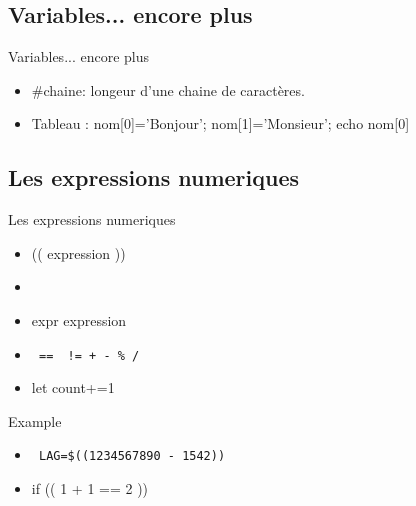 \def\subsectitle{Variables... encore plus}
\subsection{\subsectitle}
\begin{frame}{\sectitle}
\begin{block}{\subsectitle}
\begin{itemize}
\item \textdollar\textbraceleft\#chaine\textbraceright  : longeur d'une chaine de caractères.
\item Tableau : nom[0]='Bonjour'; nom[1]='Monsieur'; echo \textdollar nom[0]
\end{itemize}
\end{block}
\end{frame}

\def\subsectitle{Les expressions numeriques}
\subsection{\subsectitle}
\begin{frame}[containsverbatim]{\sectitle}
\begin{block}{\subsectitle}
\begin{itemize}
\item \textdollar (( expression ))
\item \textdollar [ expression ]
\item expr expression
\item \verb: ==  != + - % /:
\item let count+=1
\end{itemize}
\end{block}

\def\subsectitle{Example}
\begin{block}{\subsectitle}
\begin{itemize}
\item \verb! LAG=$((1234567890 - 1542))! %
\item if (( 1 + 1 == 2 ))
\end{itemize}
\end{block}

\end{frame}

\def\subsectitle{Fonctions}
